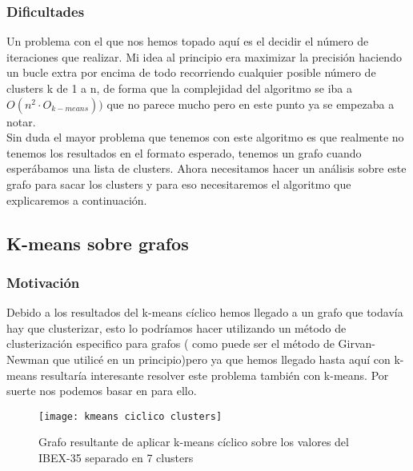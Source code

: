 \documentclass[12pt,a4paper]{article}
\begin{document}
 			\subsubsection{Dificultades}
 			Un problema con el que nos hemos topado aquí es el decidir el número de iteraciones que realizar. Mi idea al principio era maximizar la precisión haciendo un bucle extra por encima de todo recorriendo cualquier posible número de clusters k de 1 a n, de forma que la complejidad del algoritmo se iba a $O(n^2 \cdot O_{k-means}))$ que no parece mucho pero en este punto ya se empezaba a notar.\\
 			Sin duda el mayor problema que tenemos con este algoritmo es que realmente no tenemos los resultados en el formato esperado, tenemos un grafo cuando esperábamos una lista de clusters. Ahora necesitamos hacer un análisis sobre este grafo para sacar los clusters y para eso necesitaremos el algoritmo que explicaremos a continuación.\\
			\subsection{K-means sobre grafos}
			\subsubsection{Motivación}
			Debido a los resultados del k-means cíclico hemos llegado a un grafo que todavía hay que clusterizar, esto lo podríamos hacer utilizando un método de clusterización especifico para grafos ( como puede ser el método de Girvan-Newman que utilicé en un principio)pero ya que hemos llegado hasta aquí con k-means resultaría interesante resolver este problema también con k-means. Por suerte nos podemos basar en \cite{Kmeans} para ello.\\
			 \begin{figure}[H]
\centering
  \centering
  \texttt{[image: kmeans ciclico clusters]}
\caption{Grafo resultante de aplicar k-means cíclico sobre los valores del IBEX-35 separado en 7 clusters}
\label{fig:clusters}
\end{figure}
			
\end{document}
